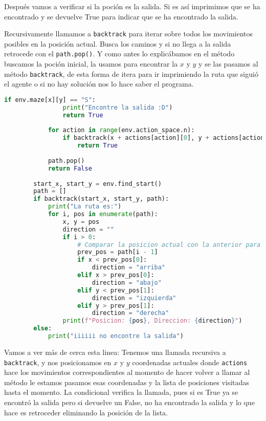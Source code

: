 \documentclass[a4paper,12pt]{article}
\begin{document}
Después vamos a verificar si la poción es la salida. Si es así imprimimos que se ha encontrado y 
se devuelve True para indicar que se ha encontrado la salida.

Recursivamente llamamos a \texttt{backtrack} para iterar sobre todos los movimientos posibles en 
la posición actual. Busca los caminos y si no llega a la salida retrocede con el \texttt{path.pop()}. Y como 
antes lo explicábamos en el método buscamos la poción inicial, la usamos para encontrar la $x$ y $y$ y se las
pasamos al método \texttt{backtrack}, de esta forma de itera para ir imprimiendo la ruta que siguió el 
agente o si no hay solución nos lo hace saber el programa. 

\begin{lstlisting}[style=mystylepython, language=Python, caption= algoritmo backtracking]
            if env.maze[x][y] == "S":
                print("Encontre la salida :D")
                return True
    
            for action in range(env.action_space.n):
                if backtrack(x + actions[action][0], y + actions[action][1], path):
                    return True
    
            path.pop()
            return False
    
        start_x, start_y = env.find_start()
        path = []
        if backtrack(start_x, start_y, path):
            print("La ruta es:")
            for i, pos in enumerate(path):
                x, y = pos
                direction = ""
                if i > 0:
                    # Comparar la posicion actual con la anterior para determinar la direccion
                    prev_pos = path[i - 1]
                    if x < prev_pos[0]:
                        direction = "arriba"
                    elif x > prev_pos[0]:
                        direction = "abajo"
                    elif y < prev_pos[1]:
                        direction = "izquierda"
                    elif y > prev_pos[1]:
                        direction = "derecha"
                print(f"Posicion: {pos}, Direccion: {direction}")
        else:
            print("iiiiii no encontre la salida")
\end{lstlisting}

Vamos a ver más de cerca esta linea: Tenemos una llamada recursiva a \texttt{backtrack}, y nos posicionamos en 
$x$ y $y$ coordenadas actuales donde \texttt{actions} hace los movimientos correspondientes al momento de hacer 
volver a llamar al método le estamos pasamos esas coordenadas y la lista de posiciones visitadas hasta el 
momento. La condicional verifica la llamada, pues si es True ya se encontró la salida pero si devuelve un 
False, no ha encontrado la salida y lo que hace es retroceder eliminando la posición de la lista.
\end{document}
